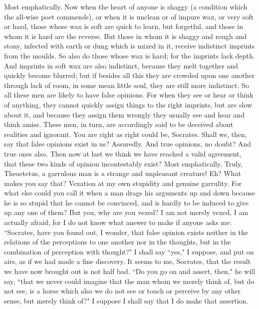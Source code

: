 \documentclass[letterpaper,12pt]{article}
\newcommand{\stephpag}[1]{\marginnote{\small\itshape\fontfamily{ppl}\selectfont #1}}
\begin{document}
\begin{drama}
\theaetetusspeaks
Most emphatically. \stephpag{e}
\socratesspeaks
Now when the heart of anyone is shaggy (a condition which the all-wise poet commends), or when it is unclean or of impure wax, or very soft or hard, those whose wax is soft are quick to learn, but forgetful, and those in whom it is hard are the reverse. But those in whom it is shaggy and rough and stony, infected with earth or dung which is mixed in it, receive indistinct imprints from the moulds. So also do those whose wax is hard; for the imprints lack depth. And imprints in soft wax are also indistinct, because \stephpag{195 a} they melt together and quickly become blurred; but if besides all this they are crowded upon one another through lack of room, in some mean little soul, they are still more indistinct. So all these men are likely to have false opinions. For when they see or hear or think of anything, they cannot quickly assign things to the right imprints, but are slow about it, and because they assign them wrongly they usually see and hear and think amiss. These men, in turn, are accordingly said to be deceived about realities and ignorant. \stephpag{b}
\theaetetusspeaks
You are right as right could be, Socrates.
\socratesspeaks
Shall we, then, say that false opinions exist in us?
\theaetetusspeaks
Assuredly.
\socratesspeaks
And true opinions, no doubt?
\theaetetusspeaks
And true ones also.
\socratesspeaks
Then now at last we think we have reached a valid agreement, that these two kinds of opinion incontestably exist?
\theaetetusspeaks
Most emphatically.
\socratesspeaks
Truly, Theaetetus, a garrulous man is a strange and unpleasant creature!
\theaetetusspeaks
Eh? What makes you say that? \stephpag{c}
\socratesspeaks
Vexation at my own stupidity and genuine garrulity. For what else could you call it when a man drags his arguments up and down because he is so stupid that he cannot be convinced, and is hardly to be induced to give up any one of them?
\theaetetusspeaks
But you, why are you vexed?
\socratesspeaks
I am not merely vexed, I am actually afraid; for I do not know what answer to make if anyone asks me: ``Socrates, have you found out, I wonder, that false opinion exists neither in the relations of the perceptions to one another nor in the thoughts, \stephpag{d} but in the combination of perception with thought?" I shall say ``yes," I suppose, and put on airs, as if we had made a fine discovery.
\theaetetusspeaks
It seems to me, Socrates, that the result we have now brought out is not half bad.
\socratesspeaks
``Do you go on and assert, then," he will say, ``that we never could imagine that the man whom we merely think of, but do not see, is a horse which also we do not see or touch or perceive by any other sense, but merely think of?" I suppose I shall say that I do make that assertion.

\end{drama}
\end{document}
